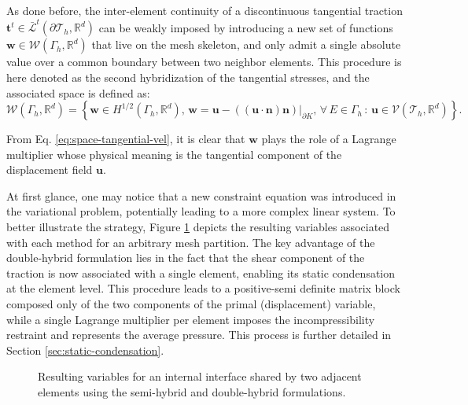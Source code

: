 \documentclass[english,11pt,3p,number,sort&compress]{elsarticle}
\begin{document}
As done before, the inter-element continuity of a discontinuous tangential traction $\bm{t}^t \in \bar{\mathcal{L}}^t(\partial\mathcal{T}_h,\mathbb{R}^d)$ can be weakly imposed by introducing a new set of functions $\bm{w} \in \mathcal{W}(\Gamma_h,\mathbb{R}^d)$ that live on the mesh skeleton, and only admit a single absolute value over a common boundary between two neighbor elements. This procedure is here denoted as the second hybridization of the tangential stresses, and the associated space is defined as:
\begin{equation}
	\label{eq:space-tangential-vel}
	\mathcal{W}(\Gamma_h,\mathbb{R}^d) = \left\{\bm{w} \in H^{1/2}(\Gamma_h,\mathbb{R}^d), \, \bm{w}=\bm{u}-((\bm{u}\cdot\bm{n})\bm{n})\lvert_{\partial K}, \, \forall \, E \in \Gamma_h \,:\, \bm{u} \in \mathcal{V}(\mathcal{T}_h,\mathbb{R}^d) \right\}.
\end{equation}

\noindent From Eq. \eqref{eq:space-tangential-vel}, it is clear that $\bm{w}$ plays the role of a Lagrange multiplier whose physical meaning is the tangential component of the displacement field $\bm{u}$.

At first glance, one may notice that a new constraint equation was introduced in the variational problem, potentially leading to a more complex linear system. To better illustrate the strategy, Figure \ref{fig:hybrid-variables} depicts the resulting variables associated with each method for an arbitrary mesh partition. The key advantage of the double-hybrid formulation lies in the fact that the shear component of the traction is now associated with a single element, enabling its static condensation at the element level. This procedure leads to a positive-semi definite matrix block composed only of the two components of the primal (displacement) variable, while a single Lagrange multiplier per element imposes the incompressibility restraint and represents the average pressure. This process is further detailed in Section \ref{sec:static-condensation}.

\begin{figure}[H]
    \centering 
	
	\caption{Resulting variables for an internal interface shared by two adjacent elements using the semi-hybrid and double-hybrid formulations.}
	\label{fig:hybrid-variables}
\end{figure}
\end{document}

